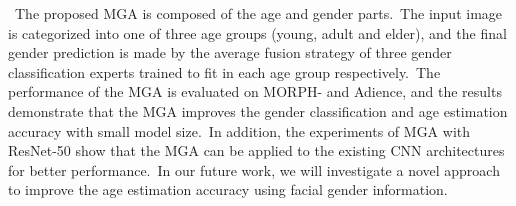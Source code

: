 \documentclass[10pt,twocolumn,letterpaper]{article}
\begin{document}
~The proposed MGA is composed of the age and gender parts.~The input image is categorized into one of three age groups (young, adult and elder), and the final gender prediction is made by the average fusion strategy of three gender classification experts trained to fit in each age group respectively.~The performance of the MGA is evaluated on MORPH- and Adience, and the results demonstrate that the MGA improves the gender classification and age estimation accuracy with small model size.~In addition, the experiments of MGA with ResNet-50 show that the MGA can be applied to the existing CNN architectures for better performance.~In our future work, we will investigate a novel approach to improve the age estimation accuracy using facial gender information. 

{\small


}
\end{document}
